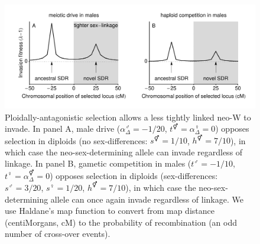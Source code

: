 \documentclass[12pt]{article}
\begin{document}
\begin{figure}[!h]
\centering
\includegraphics[width=\linewidth]{PositionPlot}
\caption{
Ploidally-antagonistic selection allows a less tightly linked neo-W to invade.
In panel A, male drive ($\alpha^\male_{\Delta} = -1/20$, $t^\Hermaphrodite = \alpha^\female_{\Delta} = 0$) opposes selection in diploids (no sex-differences: $s^\Hermaphrodite = 1/10$, $h^\Hermaphrodite = 7/10$), in which case the neo-sex-determining allele can invade regardless of linkage.   
In panel B, gametic competition in males ($t^\male = -1/10$, $t^\female = \alpha^\Hermaphrodite_{\Delta} = 0$) opposes selection in diploids (sex-differences: $s^\male = 3/20$, $s^\female = 1/20$, $h^\Hermaphrodite = 7/10$), in which case the neo-sex-determining allele can once again invade regardless of linkage.
We use Haldane's map function \citep[Equation 3 in ][]{Haldane1919} to convert from map distance (centiMorgans, cM) to the probability of recombination (an odd number of cross-over events).   
}
\label{fig:Combination_Centimorgans}
\end{figure}
\end{document}
